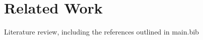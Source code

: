 \section{Related Work}
\label{sec:related_work}

Literature review, including the references outlined in main.bib

